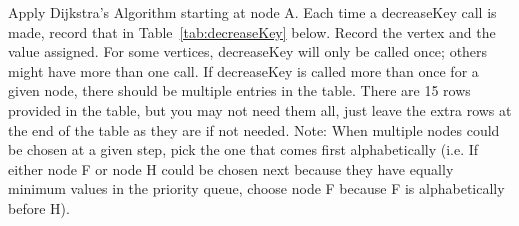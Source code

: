 \documentclass[10pt]{article}
\begin{document}
\begin{center}
\end{center}
\vspace{0.2in}
Apply Dijkstra's Algorithm starting at node A. Each time a decreaseKey call is made, record that in Table~\ref{tab:decreaseKey} below. Record the vertex and the value assigned. For some vertices, decreaseKey will only be called once; others might have more than one call. If decreaseKey is called more than once for a given node, there should be multiple entries in the table. There are 15 rows provided in the table, but you may not need them all, just leave the extra rows at the end of the table as they are if not needed. Note: When multiple nodes could be chosen at a given step, pick the one that comes first alphabetically (i.e. If either node F or node H could be chosen next because they have equally minimum values in the priority queue, choose node F because F is alphabetically before H).
\end{document}
